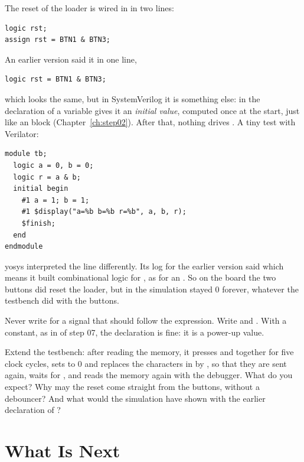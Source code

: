 The reset of the loader is wired in  in two lines:
\begin{lstlisting}
logic rst;
assign rst = BTN1 & BTN3;
\end{lstlisting}
An earlier version said it in one line,
\begin{lstlisting}
logic rst = BTN1 & BTN3;
\end{lstlisting}
which looks the same, but in SystemVerilog it is something else: \cc{=} in
the declaration of a variable gives it an \emph{initial value}, computed once
at the start, just like an  block (Chapter~\ref{ch:step02}).
After that, nothing drives . A tiny test with Verilator:
\begin{lstlisting}
module tb;
  logic a = 0, b = 0;
  logic r = a & b;
  initial begin
    #1 a = 1; b = 1;
    #1 $display("a=%b b=%b r=%b", a, b, r);
    $finish;
  end
endmodule
\end{lstlisting}
yosys interpreted the line differently. Its log for the earlier version said
which means it built combinational logic for , as for an .
So on the board the two buttons did reset the loader, but in the simulation
 stayed 0 forever, whatever the testbench did with the buttons.

\begin{pitfall}
Never write  for a signal that should follow the
expression. Write  and . With a
constant, as in  of step 07, the declaration is fine: it is
a power-up value.
\end{pitfall}

\begin{exercise}
\label{ex:step08-rst}
Extend the testbench: after reading the memory, it presses  and
 together for five clock cycles, sets  to 0 and
replaces the characters in  by , so that they are
sent again, waits for , and reads the memory again with the
debugger. What do you expect? Why may the reset come straight from the
buttons, without a debouncer? And what would the simulation have shown with
the earlier declaration of ?
\end{exercise}

\section{What Is Next}


